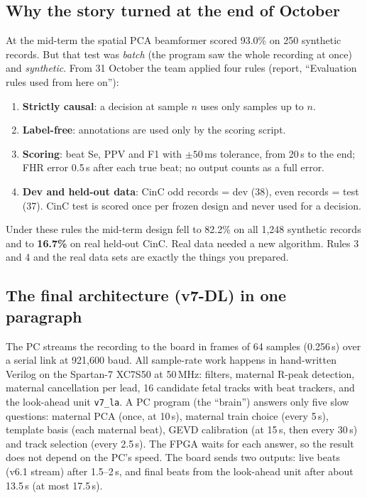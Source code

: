 \documentclass[11pt]{article}
\begin{document}
\subsection{Why the story turned at the end of October}

At the mid-term the spatial PCA beamformer scored 93.0\% on 250 synthetic records. But that test was \emph{batch} (the program saw the whole recording at once) and \emph{synthetic}. From 31 October the team applied four rules (report, ``Evaluation rules used from here on''):
\begin{enumerate}
  \item \textbf{Strictly causal}: a decision at sample $n$ uses only samples up to $n$.
  \item \textbf{Label-free}: annotations are used only by the scoring script.
  \item \textbf{Scoring}: beat Se, PPV and F1 with $\pm 50$\,ms tolerance, from 20\,s to the end; FHR error 0.5\,s after each true beat; no output counts as a full error.
  \item \textbf{Dev and held-out data}: CinC odd records = dev (38), even records = test (37). CinC test is scored once per frozen design and never used for a decision.
\end{enumerate}
Under these rules the mid-term design fell to 82.2\% on all 1,248 synthetic records and to \textbf{16.7\%} on real held-out CinC. Real data needed a new algorithm. Rules 3 and 4 and the real data sets are exactly the things you prepared.

\subsection{The final architecture (v7-DL) in one paragraph}

The PC streams the recording to the board in frames of 64 samples (0.256\,s) over a serial link at 921,600 baud. All sample-rate work happens in hand-written Verilog on the Spartan-7 XC7S50 at 50\,MHz: filters, maternal R-peak detection, maternal cancellation per lead, 16 candidate fetal tracks with beat trackers, and the look-ahead unit \texttt{v7\_la}. A PC program (the ``brain'') answers only five slow questions: maternal PCA (once, at 10\,s), maternal train choice (every 5\,s), template basis (each maternal beat), GEVD calibration (at 15\,s, then every 30\,s) and track selection (every 2.5\,s). The FPGA waits for each answer, so the result does not depend on the PC's speed. The board sends two outputs: live beats (v6.1 stream) after 1.5--2\,s, and final beats from the look-ahead unit after about 13.5\,s (at most 17.5\,s).
\end{document}
